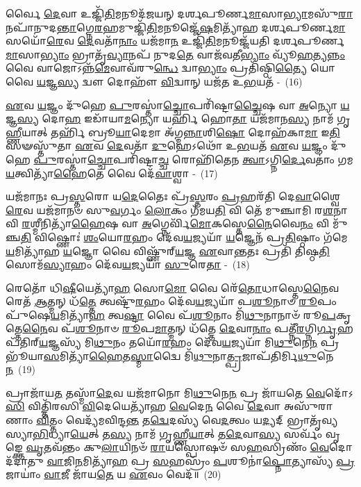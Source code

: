𑌰𑍍𑌵𑍈 \ul{𑌦𑍇}\-𑌵𑌾 𑌉𑌜𑍍𑌜𑌿᳴\-\ul{𑌤𑌿}\-𑌮𑌨𑍂𑌦᳴𑌜𑌯𑌨𑍍 𑌦𑌰𑍍\mbox{}𑌶𑌪𑍂𑌰𑍍𑌣\-\ul{𑌮𑌾}\-𑌸𑌾\-\ul{𑌭𑍍𑌯𑌾}\-𑌮𑌸𑍁᳴\-\ul{𑌰𑌾}\-𑌨𑌪𑌾᳴\-𑌨𑍁𑌦\-\ul{𑌨𑍍𑌤𑌾}\-𑌗𑍍𑌨𑍇\-\ul{𑌰}\-𑌹\-𑌮𑍁𑌜𑍍𑌜𑌿᳴\-\ul{𑌤𑌿}\-\-𑌮𑌨𑍂𑌜𑍍𑌜𑍇᳴\-\ul{𑌷}\-𑌮𑌿𑌤𑍍𑌯𑌾᳴𑌹 𑌦𑌰𑍍\mbox{}𑌶𑌪𑍂𑌰𑍍𑌣\-\ul{𑌮𑌾}\-𑌸𑌯𑍋᳴\-\ul{𑌰𑍇}\-𑌵 \ul{𑌦𑍇}\-𑌵𑌤𑌾᳴\-\ul{𑌨𑌾𑌂} 𑌯𑌜᳴𑌮𑌾\-\ul{𑌨} 𑌉𑌜𑍍𑌜𑌿᳴\-\ul{𑌤𑌿}\-𑌮𑌨𑍂𑌜𑍍𑌜᳴𑌯𑌤𑌿 𑌦𑌰𑍍\mbox{}𑌶𑌪𑍂𑌰𑍍𑌣\-\ul{𑌮𑌾}\-𑌸𑌾\-\ul{𑌭𑍍𑌯𑌾𑌂} 𑌭𑍍𑌰𑌾𑌤𑍃᳴\-\ul{𑌵𑍍𑌯𑌾}\-𑌨𑌪᳴ 𑌨𑍁𑌦\-\ul{𑌤𑍇} 𑌵𑌾𑌜᳴𑌵𑌤𑍀\-\ul{𑌭𑍍𑌯𑌾𑌂} 𑌵𑍍𑌯𑍂᳴\-\ul{𑌹}\-𑌤𑍍𑌯\-\ul{𑌨𑍍𑌨𑌂} 𑌵𑍈 𑌵𑌾𑌜𑍋\-𑌽𑌨𑍍𑌨᳴\-\ul{𑌮𑍇}\-𑌵𑌾𑌵᳴\-𑌰𑍁\-\ul{𑌨𑍍𑌧𑍇} 𑌦𑍍𑌵𑌾\-\ul{𑌭𑍍𑌯𑌾𑌂} 𑌪𑍍𑌰𑌤𑌿᳴𑌷𑍍𑌠𑌿\-\ul{𑌤𑍍𑌯𑍈} 𑌯𑍋 𑌵𑍈 \ul{𑌯}\-𑌜𑍍𑌞\-\ul{𑌸𑍍𑌯} 𑌦𑍍𑌵𑍗 𑌦𑍋𑌹𑍗᳴ \ul{𑌵𑌿}\-𑌦𑍍𑌵𑌾𑌨𑍍 𑌯𑌜᳴𑌤 𑌉\-\ul{𑌭}\-𑌯𑌤᳴ -~(16)

\-\ul{𑌏}\-𑌵 \ul{𑌯}\-𑌜𑍍𑌞𑌂 𑌦𑍁᳴𑌹𑍇 \ul{𑌪𑍁}\-𑌰𑌸𑍍𑌤𑌾॑\-\ul{𑌚𑍍𑌚𑍋}\-𑌪𑌰𑌿᳴𑌷𑍍𑌟𑌾\-\ul{𑌚𑍍𑌚𑍈}\-𑌷 𑌵𑌾 \ul{𑌅}\-𑌨𑍍𑌯𑍋 \ul{𑌯}\-𑌜𑍍𑌞\-\ul{𑌸𑍍𑌯} 𑌦𑍋\-\ul{𑌹} 𑌇𑌡𑌾᳴𑌯𑌾\-\ul{𑌮}\-𑌨𑍍𑌯𑍋 𑌯𑌰𑍍\mbox{}\-\ul{𑌹𑌿} 𑌹𑍋\-\ul{𑌤𑌾} 𑌯𑌜᳴𑌮𑌾𑌨\-\ul{𑌸𑍍𑌯} 𑌨𑌾𑌮᳴ 𑌗𑍃\-\ul{𑌹𑍍𑌣𑍀}\-𑌯𑌾𑌤𑍍 𑌤𑌰𑍍\mbox{}𑌹𑌿᳴ 𑌬𑍍𑌰𑍂\-\ul{𑌯𑌾}\-𑌦𑍇𑌮𑌾 𑌅᳴𑌗𑍍𑌮\-\ul{𑌨𑍍𑌨𑌾}\-𑌶𑌿\-\ul{𑌷𑍋} 𑌦𑍋𑌹᳴𑌕𑌾\-\ul{𑌮𑌾} 𑌇\-\ul{𑌤𑌿} 𑌸𑍟𑌸𑍍𑌤𑍁᳴𑌤𑌾 \ul{𑌏}\-𑌵 \ul{𑌦𑍇}\-𑌵𑌤𑌾᳴ \ul{𑌦𑍁}\-𑌹𑍇\-𑌽𑌥𑍋᳴ 𑌉\-\ul{𑌭}\-𑌯𑌤᳴ \ul{𑌏}\-𑌵 \ul{𑌯}\-𑌜𑍍𑌞𑌂 𑌦𑍁᳴𑌹𑍇 \ul{𑌪𑍁}\-𑌰𑌸𑍍𑌤𑌾॑\-\ul{𑌚𑍍𑌚𑍋}\-𑌪𑌰𑌿᳴𑌷𑍍𑌟𑌾\-\ul{𑌚𑍍𑌚} 𑌰𑍋𑌹𑌿᳴𑌤𑍇𑌨 \ul{𑌤𑍍𑌵𑌾}\-\-𑌽𑌗𑍍𑌨𑌿\-\ul{𑌰𑍍𑌦𑍇}\-𑌵𑌤𑌾𑌂॑ 𑌗𑌮\-\ul{𑌯}\-𑌤𑍍𑌵𑌿𑌤𑍍𑌯𑌾᳴\-\ul{𑌹𑍈}\-𑌤𑍇 𑌵𑍈 𑌦𑍇᳴\-\ul{𑌵𑌾}\-𑌶𑍍𑌵𑌾 -~(17)

𑌯𑌜᳴𑌮𑌾𑌨𑌃 𑌪𑍍𑌰\-\ul{𑌸𑍍𑌤}\-𑌰𑍋 𑌯\-\ul{𑌦𑍇}\-𑌤𑍈𑌃 𑌪𑍍𑌰᳴\-\ul{𑌸𑍍𑌤}\-𑌰𑌂 \ul{𑌪𑍍𑌰}\-𑌹𑌰᳴𑌤𑌿 𑌦𑍇\-\ul{𑌵𑌾}\-𑌶𑍍𑌵𑍈\-\ul{𑌰𑍇}\-𑌵 𑌯𑌜᳴𑌮𑌾𑌨𑍞 𑌸𑍁\-\ul{𑌵}\-𑌰𑍍𑌗𑌂 \ul{𑌲𑍋}\-𑌕𑌂 𑌗᳴𑌮𑌯\-\ul{𑌤𑌿} 𑌵𑌿 𑌤𑍇᳴ 𑌮𑍁𑌞𑍍𑌚𑌾𑌮𑌿 𑌰\-\ul{𑌶}\-𑌨𑌾 𑌵𑌿 \ul{𑌰}\-𑌶𑍍𑌮𑍀𑌨𑌿𑌤𑍍𑌯𑌾᳴\-\ul{𑌹𑍈}\-𑌷 𑌵𑌾 \ul{𑌅}\-𑌗𑍍𑌨𑍇𑌰𑍍𑌵𑌿᳴\-\ul{𑌮𑍋}\-𑌕𑌸𑍍𑌤𑍇\-\ul{𑌨𑍈}\-𑌵𑍈\-\ul{𑌨𑌂} 𑌵𑌿 𑌮𑍁᳴𑌞𑍍𑌚\-\ul{𑌤𑌿} 𑌵𑌿𑌷𑍍𑌣𑍋𑌃॑ \ul{𑌶𑌂}\-𑌯𑍋\-\ul{𑌰}\-𑌹𑌂 𑌦𑍇᳴𑌵\-\ul{𑌯}\-𑌜𑍍𑌯𑌯𑌾᳴ \ul{𑌯}\-𑌜𑍍𑌞𑍇𑌨᳴ 𑌪𑍍𑌰\-\ul{𑌤𑌿}\-𑌷𑍍𑌠𑌾𑌂 𑌗᳴𑌮𑍇\-\ul{𑌯}\-𑌮𑌿𑌤𑍍𑌯𑌾᳴𑌹 \ul{𑌯}\-𑌜𑍍𑌞𑍋 𑌵𑍈 𑌵𑌿𑌷𑍍𑌣𑍁᳴𑌰𑍍‌\-\ul{𑌯}\-𑌜𑍍𑌞 \ul{𑌏}\-𑌵𑌾\-\ul{𑌨𑍍𑌤}\-𑌤𑌃 𑌪𑍍𑌰𑌤𑌿᳴ 𑌤𑌿𑌷𑍍𑌠\-\ul{𑌤𑌿} 𑌸𑍋𑌮᳴\-\ul{𑌸𑍍𑌯𑌾}\-𑌹𑌂 𑌦𑍇᳴𑌵\-\ul{𑌯}\-𑌜𑍍𑌯𑌯𑌾᳴ \ul{𑌸𑍁}\-𑌰𑍇\-\ul{𑌤𑌾} -~(18)

𑌰𑍇𑌤𑍋᳴ 𑌧𑌿\-\ul{𑌷𑍀}\-𑌯𑍇𑌤𑍍𑌯𑌾᳴\-\ul{𑌹} 𑌸𑍋\-\ul{𑌮𑍋} 𑌵𑍈 𑌰𑍇᳴\-\ul{𑌤𑍋}\-𑌧𑌾𑌸𑍍𑌤𑍇\-\ul{𑌨𑍈}\-𑌵 𑌰𑍇𑌤᳴ \ul{𑌆}\-𑌤𑍍𑌮𑌨𑍍 𑌧᳴\-\ul{𑌤𑍍𑌤𑍇} 𑌤𑍍𑌵𑌷𑍍𑌟𑍁᳴\-\ul{𑌰}\-𑌹𑌂 𑌦𑍇᳴𑌵\-\ul{𑌯}\-𑌜𑍍𑌯𑌯𑌾᳴ 𑌪\-\ul{𑌶𑍂}\-𑌨𑌾𑍞 \ul{𑌰𑍂}\-𑌪𑌂 𑌪𑍁᳴𑌷𑍇\-\ul{𑌯}\-𑌮𑌿𑌤𑍍𑌯𑌾᳴\-\ul{𑌹} 𑌤𑍍𑌵\-\ul{𑌷𑍍𑌟𑌾} 𑌵𑍈 𑌪᳴\-\ul{𑌶𑍂}\-𑌨𑌾𑌂 𑌮𑌿᳴\-\ul{𑌥𑍁}\-𑌨𑌾𑌨𑌾𑍞᳴ 𑌰𑍂\-\ul{𑌪}\-𑌕𑍃𑌤𑍍𑌤𑍇\-\ul{𑌨𑍈}\-𑌵 𑌪᳴\-\ul{𑌶𑍂}\-𑌨𑌾𑍞 \ul{𑌰𑍂}\-𑌪\-\ul{𑌮𑌾}\-𑌤𑍍𑌮𑌨𑍍 𑌧᳴𑌤𑍍𑌤𑍇 \ul{𑌦𑍇}\-𑌵𑌾\-\ul{𑌨𑌾𑌂} 𑌪𑌤𑍍𑌨𑍀᳴\-\ul{𑌰}\-𑌗𑍍𑌨𑌿\-\ul{𑌰𑍍𑌗𑍃}\-𑌹𑌪᳴𑌤𑌿𑌰𑍍‌\-\ul{𑌯}\-𑌜𑍍𑌞𑌸𑍍𑌯᳴ 𑌮𑌿\-\ul{𑌥𑍁}\-𑌨𑌂 𑌤𑌯𑍋᳴\-\ul{𑌰}\-𑌹𑌂 𑌦𑍇᳴𑌵\-\ul{𑌯}\-𑌜𑍍𑌯𑌯𑌾᳴ 𑌮𑌿\-\ul{𑌥𑍁}\-𑌨𑍇\-\ul{𑌨} 𑌪𑍍𑌰 𑌭𑍂᳴𑌯𑌾\-\ul{𑌸}\-𑌮𑌿𑌤𑍍𑌯𑌾᳴\-\ul{𑌹𑍈}\-𑌤\-\ul{𑌸𑍍𑌮𑌾}\-𑌦𑍍𑌵𑍈 𑌮𑌿᳴\-\ul{𑌥𑍁}\-𑌨𑌾\-\ul{𑌤𑍍𑌪𑍍𑌰}\-𑌜𑌾𑌪᳴𑌤𑌿𑌰𑍍𑌮𑌿\-\ul{𑌥𑍁}\-𑌨𑍇\-\ul{𑌨}\-~(19)

𑌪𑍍𑌰𑌾𑌜𑌾᳴𑌯\-\ul{𑌤} 𑌤𑌸𑍍𑌮𑌾᳴\-\ul{𑌦𑍇}\-𑌵 𑌯𑌜᳴𑌮𑌾𑌨𑍋 𑌮𑌿\-\ul{𑌥𑍁}\-𑌨𑍇\-\ul{𑌨} 𑌪𑍍𑌰 𑌜𑌾᳴𑌯𑌤𑍇 \ul{𑌵𑍇}\-𑌦𑍋᳴\-𑌽\-\ul{𑌸𑌿} 𑌵𑌿𑌤𑍍𑌤𑌿᳴𑌰𑌸𑌿 \ul{𑌵𑌿}\-𑌦𑍇𑌯𑍇𑌤𑍍𑌯𑌾᳴𑌹 \ul{𑌵𑍇}\-𑌦𑍇\-\ul{𑌨} 𑌵𑍈 \ul{𑌦𑍇}\-𑌵𑌾 𑌅𑌸𑍁᳴𑌰𑌾𑌣𑌾𑌂 \ul{𑌵𑌿}\-𑌤𑍍𑌤𑌂 𑌵𑍇𑌦𑍍𑌯᳴𑌮𑌵𑌿𑌨𑍍𑌦\-\ul{𑌨𑍍𑌤} 𑌤\-\ul{𑌦𑍍𑌵𑍇}\-𑌦𑌸𑍍𑌯᳴ 𑌵𑍇\-\ul{𑌦}\-𑌤𑍍𑌵𑌂 𑌯\-\ul{𑌦𑍍𑌯}\-𑌦𑍍 𑌭𑍍𑌰𑌾𑌤𑍃᳴𑌵𑍍𑌯𑌸𑍍𑌯𑌾\-\ul{𑌭𑌿}\-𑌧𑍍𑌯𑌾\-\ul{𑌯𑍇}\-𑌤𑍍 𑌤\-\ul{𑌸𑍍𑌯} 𑌨𑌾𑌮᳴ 𑌗𑍃𑌹𑍍𑌣𑍀\-\ul{𑌯𑌾}\-𑌤𑍍 𑌤\-\ul{𑌦𑍇}\-𑌵𑌾\-\ul{𑌸𑍍𑌯} 𑌸𑌰𑍍𑌵𑌂᳴ 𑌵𑍃𑌙𑍍𑌕𑍍𑌤𑍇 \ul{𑌘𑍃}\-𑌤𑌵᳴𑌨𑍍𑌤𑌂 𑌕𑍁\-\ul{𑌲𑌾}\-𑌯𑌿𑌨𑍞᳴ \ul{𑌰𑌾}\-𑌯𑌸𑍍𑌪𑍋𑌷𑍞᳴ 𑌸\-\ul{𑌹}\-𑌸𑍍𑌰𑌿𑌣𑌂᳴ \ul{𑌵𑍇}\-𑌦𑍋 𑌦᳴𑌦𑌾𑌤𑍁 \ul{𑌵𑌾}\-𑌜𑌿\-\ul{𑌨}\-𑌮𑌿𑌤𑍍𑌯𑌾᳴\-\ul{𑌹} 𑌪𑍍𑌰 \ul{𑌸}\-𑌹𑌸𑍍𑌰𑌂᳴ \ul{𑌪}\-𑌶𑍂𑌨𑌾॑\-\ul{𑌪𑍍𑌨𑍋}\-𑌤𑍍𑌯𑌾𑌸𑍍𑌯᳴ \ul{𑌪𑍍𑌰}\-𑌜𑌾𑌯𑌾𑌂॑ \ul{𑌵𑌾}\-𑌜𑍀 𑌜𑌾᳴𑌯\-\ul{𑌤𑍇} 𑌯 \ul{𑌏}\-𑌵𑌂 𑌵𑍇𑌦᳴॥~(20)


